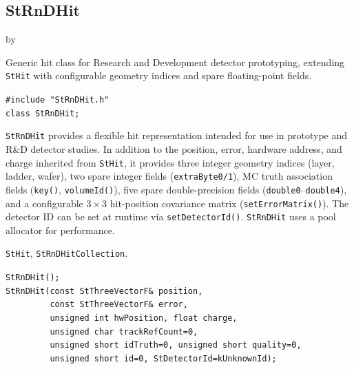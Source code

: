 \documentclass[twoside]{article}
\newcommand{\entrylabel}[1]{\mbox{\textbf{{#1}}}\hfil}%
\newenvironment{entry}
{\begin{list}{}%
    {\renewcommand{\makelabel}{\entrylabel}%
     \setlength{\labelwidth}{90pt}%
     \setlength{\leftmargin}{\labelwidth}
     \advance\leftmargin by \labelsep%
      }%
    }%
  {\end{list}}
\newcommand{\Entrylabel}[1]%
{\raisebox{0pt}[1ex][0pt]{\makebox[\labelwidth][l]%
    {\parbox[t]{\labelwidth}{\hspace{0pt}\textbf{{#1}}}}}}
\newenvironment{Entry}%
{\renewcommand{\entrylabel}{\Entrylabel}\begin{entry}}%
  {\end{entry}}
\begin{document}
\subsection{StRnDHit}
\label{sec:StRnDHit}
\begin{Entry}
\item[Summary]
    Generic hit class for Research and Development detector prototyping,
    extending \texttt{StHit} with configurable geometry indices and spare
    floating-point fields.

\item[Synopsis]
    \verb+#include "StRnDHit.h"+\\
    \verb+class StRnDHit;+\\

\item[Description]
    \texttt{StRnDHit} provides a flexible hit representation intended for
    use in prototype and R\&D detector studies.  In addition to the position,
    error, hardware address, and charge inherited from \texttt{StHit}, it
    provides three integer geometry indices (layer, ladder, wafer), two
    spare integer fields (\texttt{extraByte0/1}), MC truth association
    fields (\texttt{key()}, \texttt{volumeId()}), five spare
    double-precision fields (\texttt{double0}--\texttt{double4}),
    and a configurable $3\times3$ hit-position covariance matrix
    (\texttt{setErrorMatrix()}).  The detector ID can be set at runtime
    via \texttt{setDetectorId()}.  \texttt{StRnDHit} uses a pool allocator
    for performance.

\item[Related Classes]
    \texttt{StHit}, \texttt{StRnDHitCollection}.

\item[Public\\ Constructors]
    \verb+StRnDHit();+\\
    \verb+StRnDHit(const StThreeVectorF& position,+\\
    \verb+         const StThreeVectorF& error,+\\
    \verb+         unsigned int hwPosition, float charge,+\\
    \verb+         unsigned char trackRefCount=0,+\\
    \verb+         unsigned short idTruth=0, unsigned short quality=0,+\\
    \verb+         unsigned short id=0, StDetectorId=kUnknownId);+\\


\end{Entry}
\end{document}
